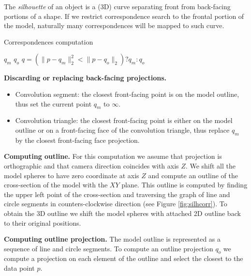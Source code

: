 The \emph{silhouette} of an object is a (3D) curve separating front from back-facing portions of a shape. If we restrict correspondence search to the frontal portion of the model, naturally many correspondences will be mapped to such curve. 

\FINISH


% 

\begin{algorithm}
\caption{Correspondences computation}
\begin{algorithmic}[1]
    	 \State {} $q_m$
    	 \State {}
    	 \State {} $q_o$
         \State $q=(\|{p - q_m}\|_2^2 < \|{p - q_o}\|_2) ? q_m : q_o$
    \EndFor
\end{algorithmic}
\label{alg:correspondences}
\end{algorithm}


\textbf{Discarding or replacing back-facing projections.}
\begin{itemize}
	\item Convolution segment: the closest front-facing point is on the model outline, thus set the current point $q_m$ to $\infty$.
	\item Convolution triangle: the closest front-facing point is either on the model outline or on a front-facing face of the convolution triangle, thus replace $q_m$ by the closest front-facing face projection.
\end{itemize}

\textbf{Computing outline.}
For this computation we assume that projection is orthographic and that camera direction coincides with axis $Z$. We shift all the model spheres to have zero coordinate at axis $Z$ and compute an outline of the cross-section of the model with the $XY$ plane. This outline is computed by finding the upper left point of the cross-section and traversing the graph of line and circle segments in counters-clockwise direction (see Figure \ref{fig:silhcorr}). To obtain the 3D outline we shift the model spheres with attached 2D outline back to their original positions.




\textbf{Computing outline projection.}
The model outline is represented as a sequence of line and circle segments. To compute an outline projection $q_o$ we compute a projection on each element of the outline and select the closest to the data point $p$.

